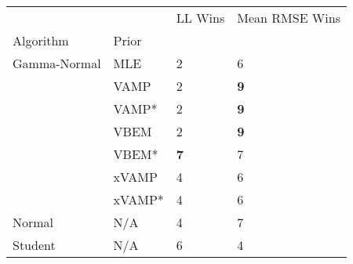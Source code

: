 \begin{tabular}{llll}
\toprule
        &     &     LL Wins & Mean RMSE Wins \\
Algorithm & Prior &             &                \\
\midrule
Gamma-Normal & MLE &           2 &              6 \\
        & VAMP &           2 &     \textbf{9} \\
        & VAMP* &           2 &     \textbf{9} \\
        & VBEM &           2 &     \textbf{9} \\
        & VBEM* &  \textbf{7} &              7 \\
        & xVAMP &           4 &              6 \\
        & xVAMP* &           4 &              6 \\
Normal & N/A &           4 &              7 \\
Student & N/A &           6 &              4 \\
\bottomrule
\end{tabular}

